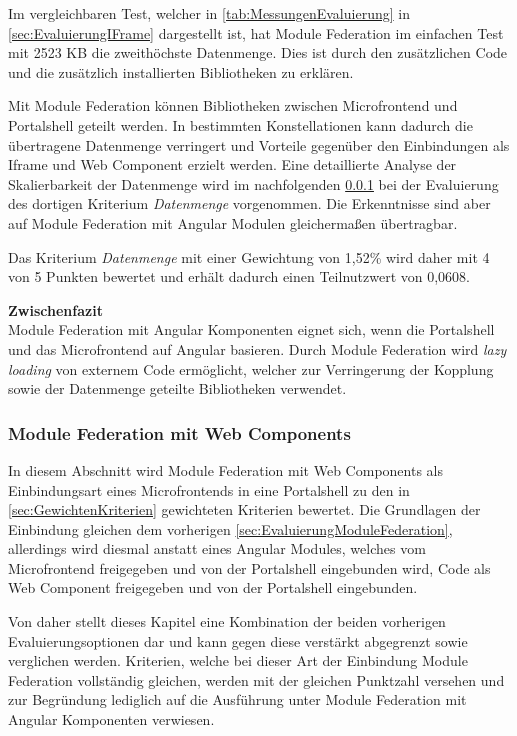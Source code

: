 Im vergleichbaren Test, welcher in \cref{tab:MessungenEvaluierung} in \cref{sec:EvaluierungIFrame} dargestellt ist, hat Module Federation im einfachen Test mit 2523 KB die zweithöchste Datenmenge. Dies ist durch den zusätzlichen Code und die zusätzlich installierten Bibliotheken zu erklären.

Mit Module Federation können Bibliotheken zwischen Microfrontend und Portalshell geteilt werden. In bestimmten Konstellationen kann dadurch die übertragene Datenmenge verringert und Vorteile gegenüber den Einbindungen als Iframe und Web Component erzielt werden. Eine detaillierte Analyse der Skalierbarkeit der Datenmenge wird im nachfolgenden \cref{sec:EvaluierungModuleFederationWC} bei der Evaluierung des dortigen Kriterium \textit{Datenmenge} vorgenommen. Die Erkenntnisse sind aber auf Module Federation mit Angular Modulen gleichermaßen übertragbar.

Das Kriterium \textit{Datenmenge} mit einer Gewichtung von 1,52\% wird daher mit 4 von 5 Punkten bewertet und erhält dadurch einen Teilnutzwert von 0,0608.

\textbf{Zwischenfazit}\\
Module Federation mit Angular Komponenten eignet sich, wenn die Portalshell und das Microfrontend auf Angular basieren. Durch Module Federation wird \textit{lazy loading} von externem Code ermöglicht, welcher zur Verringerung der Kopplung sowie der Datenmenge geteilte Bibliotheken verwendet.

\subsubsection{Module Federation mit Web Components}\label{sec:EvaluierungModuleFederationWC}

In diesem Abschnitt wird Module Federation mit Web Components als Einbindungsart eines Microfrontends in eine Portalshell zu den in \cref{sec:GewichtenKriterien} gewichteten Kriterien bewertet. Die Grundlagen der Einbindung gleichen dem vorherigen \cref{sec:EvaluierungModuleFederation}, allerdings wird diesmal anstatt eines Angular Modules, welches vom Microfrontend freigegeben und von der Portalshell eingebunden wird, Code als Web Component freigegeben und von der Portalshell eingebunden.

Von daher stellt dieses Kapitel eine Kombination der beiden vorherigen Evaluierungsoptionen dar und kann gegen diese verstärkt abgegrenzt sowie verglichen werden. Kriterien, welche bei dieser Art der Einbindung Module Federation vollständig gleichen, werden mit der gleichen Punktzahl versehen und zur Begründung lediglich auf die Ausführung unter Module Federation mit Angular Komponenten verwiesen.

